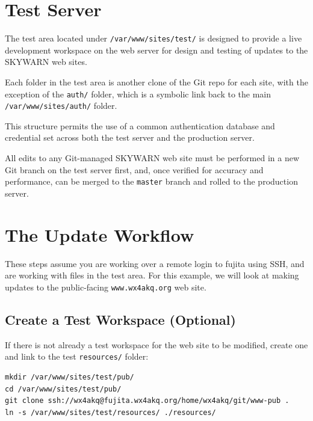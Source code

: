 \documentclass[pdflatex,letterpaper,twoside,12pt]{book}
\begin{document}

\section{Test Server}

The test area located under \texttt{/var/www/sites/test/} is designed to provide a live development workspace on the web server for design and testing of updates to the SKYWARN web sites.

Each folder in the test area is another clone of the Git repo for each site, with the exception of the \texttt{auth/} folder, which is a symbolic link back to the main\\\texttt{/var/www/sites/auth/} folder.

This structure permits the use of a common authentication database and credential set across both the test server and the production server.

All edits to any Git-managed SKYWARN web site must be performed in a new Git branch on the test server first, and, once verified for accuracy and performance, can be merged to the \texttt{master} branch and rolled to the production server.


\section{The Update Workflow}

These steps assume you are working over a remote login to fujita using SSH, and are working with files in the test area.  For this example, we will look at making updates to the public-facing \texttt{www.wx4akq.org} web site.

\subsection{Create a Test Workspace (Optional)}

If there is not already a test workspace for the web site to be modified, create one and link to the test \texttt{resources/} folder:

\begin{verbatim}
mkdir /var/www/sites/test/pub/
cd /var/www/sites/test/pub/
git clone ssh://wx4akq@fujita.wx4akq.org/home/wx4akq/git/www-pub .
ln -s /var/www/sites/test/resources/ ./resources/
\end{verbatim}
\end{document}
